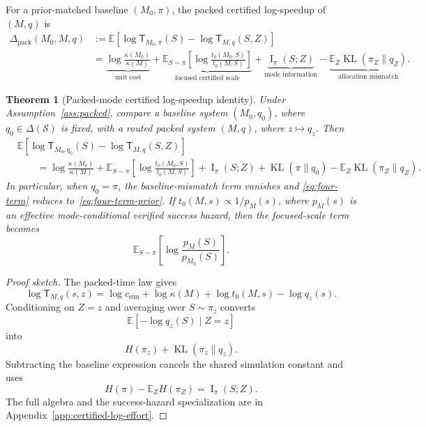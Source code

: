 \documentclass{article}
\newtheorem{theorem}{Theorem}
\DeclareMathOperator{\KL}{KL}
\DeclareMathOperator{\MI}{I}
\newcommand{\cS}{\mathcal{S}}
\newcommand{\E}{\mathbb{E}}
\begin{document}
For a prior-matched baseline \((M_0,\pi)\), the packed certified log-speedup of
\((M,q)\) is
\begin{equation}
\label{eq:four-term-prior}
\begin{aligned}
    \Delta_{\mathrm{pack}}(M_0,M,q)
    &:=
    \E\!\left[
        \log \mathsf T_{M_0,\pi}(S)
        -
        \log \mathsf T_{M,q}(S,Z)
    \right]
    \\
    &=
    \underbrace{\log\frac{\kappa(M_0)}{\kappa(M)}}_{\text{unit cost}}
    +
    \underbrace{
    \E_{S\sim\pi}
    \left[
        \log\frac{t_0(M_0,S)}{t_0(M,S)}
    \right]
    }_{\text{focused certified scale}}
    +
    \underbrace{\MI_\pi(S;Z)}_{\text{mode information}}
    -
    \underbrace{\E_Z\KL(\pi_Z\|q_Z)}_{\text{allocation mismatch}} .
\end{aligned}
\end{equation}

\begin{theorem}[Packed-mode certified log-speedup identity]
\label{thm:four-term}
Under Assumption~\ref{ass:packed}, compare a baseline system \((M_0,q_0)\), where
\(q_0\in\Delta(\cS)\) is fixed, with a routed packed system \((M,q)\), where
\(z\mapsto q_z\).  Then
\begin{equation}
\label{eq:four-term}
\begin{aligned}
&\E\!\left[
    \log \mathsf T_{M_0,q_0}(S)
    -
    \log \mathsf T_{M,q}(S,Z)
\right]
\\
&\qquad =
\log\frac{\kappa(M_0)}{\kappa(M)}
+
\E_{S\sim\pi}
\left[
    \log\frac{t_0(M_0,S)}{t_0(M,S)}
\right]
+
\MI_\pi(S;Z)
+
\KL(\pi\|q_0)
-
\E_Z\KL(\pi_Z\|q_Z).
\end{aligned}
\end{equation}
In particular, when \(q_0=\pi\), the baseline-mismatch term vanishes and
\eqref{eq:four-term} reduces to~\eqref{eq:four-term-prior}.
If \(t_0(M,s)\propto 1/p_M(s)\), where \(p_M(s)\) is an effective mode-conditional
verified success hazard, then the focused-scale term becomes
\[
    \E_{S\sim\pi}
    \left[
        \log\frac{p_M(S)}{p_{M_0}(S)}
    \right].
\]
\end{theorem}

\begin{proof}[Proof sketch]
The packed-time law gives
\[
    \log \mathsf T_{M,q}(s,z)
    =
    \log c_{\mathrm{sim}}
    +
    \log\kappa(M)
    +
    \log t_0(M,s)
    -
    \log q_z(s).
\]
Conditioning on \(Z=z\) and averaging over \(S\sim\pi_z\) converts
\[
    \E[-\log q_z(S)\mid Z=z]
\]
into
\[
    H(\pi_z)+\KL(\pi_z\|q_z).
\]
Subtracting the baseline expression cancels the shared simulation constant and uses
\[
    H(\pi)-\E_ZH(\pi_Z)=\MI_\pi(S;Z).
\]
The full algebra and the success-hazard specialization are in
Appendix~\ref{app:certified-log-effort}.
\end{proof}
\end{document}
